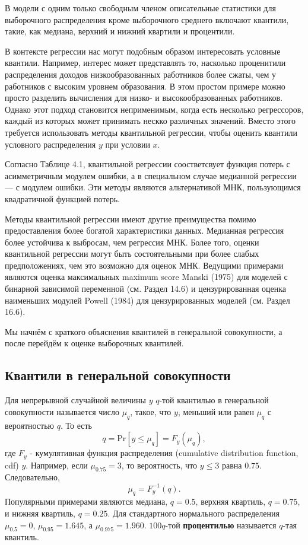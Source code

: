 В модели с одним только свободным членом описательные статистики для выборочного распределения кроме выборочного среднего включают квантили, такие, как медиана, верхний и нижний квартили и процентили.

В контексте регрессии нас могут подобным образом интересовать условные квантили. Например, интерес может представлять то, насколько проценитили распределения доходов низкообразованных работников более сжаты, чем у работников с высоким уровнем образования. В этом простом примере можно просто разделить вычисления для низко- и высокообразованных работников. Однако этот подход становится неприменимым, когда есть несколько регрессоров, каждый из которых может принимать нескко различных значений. Вместо этого требуется использовать методы квантильной регрессии, чтобы оценить квантили условного распределения $y$ при условии $x$.

Согласно Таблице 4.1, квантильной регрессии соостветсвует функция потерь с асимметричным модулем ошибки, а в специальном случае медианной регрессии --- с модулем ошибки. Эти методы являются альтернативой МНК, пользующимся квадратичной функцией потерь.

Методы квантильной регрессии имеют другие преимущества помимо предоставления более богатой характеристики данных. Медианная регрессия более устойчива к выбросам, чем регрессия МНК. Более того, оценки квантильной регрессии могут быть состоятельными при более слабых предположениях, чем это возможно для оценок МНК. Ведущими примерами являются оценка максимальных maximum score Manski (1975) для моделей с бинарной зависимой переменной (см. Раздел 14.6) и цензурированная оценка наименьших модулей Powell (1984) для цензурированных моделей (см. Раздел 16.6).

Мы начнём с краткого объяснения квантилей в генеральной совокупности, а после перейдём к оценке выборочных квантилей.

\subsection{Квантили в генеральной совокупности}

Для непрерывной случайной величины $y$ $q$-той квантилью в генеральной совокупности называется число $\mu_q$, такое, что $y$, меньший или равен $\mu_q$ с вероятностью $q$. То есть
$$
q = \mathrm{Pr}[y \leq \mu_q] = F_y(\mu_q),
$$
где $F_y$ - кумулятивная функция распределения (cumulative distribution function, cdf) $y$. Например, если $\mu_{0.75}=3$, то вероятность, что $y\leq 3$ равна $0.75$. Следовательно,
$$
\mu_q = F_y^{-1}(q).
$$
Популярными примерами являются медиана, $q=0.5$, верхняя квартиль, $q=0.75$, и нижняя квартиль, $q=0.25$. Для стандартного нормального распределения $\mu_{0.5}=0$, $\mu_{0.95}=1.645$, а $\mu_{0.975}=1.960$.  $100q$-той \textbf{процентилью} называется $q$-тая квантиль.

